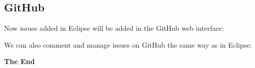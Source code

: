 \documentclass{beamer}
\begin{document}
\subsection{GitHub}
\begin{frame}
  Now issues added in Eclipse will be added in the GitHub web interface:

\end{frame}

\begin{frame}
  We can also comment and manage issues on GitHub the same way as in Eclipse:

\end{frame}

\begin{frame}
  \begin{center}
	{\bfseries \Huge The End}
  \end{center}
\end{frame}
\end{document}
